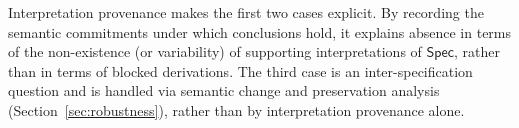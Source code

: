 \documentclass[acmsmall,nonacm]{acmart}
\theoremstyle{remark}
\numberwithin{definition}{section}
\numberwithin{theorem}{section}
\numberwithin{lemma}{section}
\numberwithin{corollary}{section}
\numberwithin{remark}{section}
\numberwithin{example}{section}
\numberwithin{observation}{section}
\numberwithin{assumption}{section}
\newcommand{\Spec}{\mathsf{Spec}}
\begin{document}
Interpretation provenance makes the first two cases explicit.
By recording the semantic commitments under which conclusions hold, it explains
absence in terms of the non-existence (or variability) of supporting
interpretations of $\Spec$, rather than in terms of blocked derivations.
The third case is an inter-specification question and is handled via semantic
change and preservation analysis (Section~\ref{sec:robustness}), rather than by
interpretation provenance alone.


\end{document}

